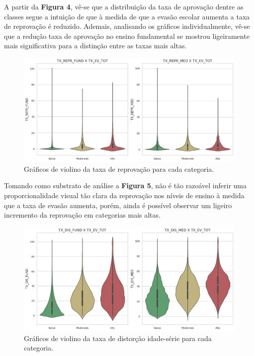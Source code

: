 \par A partir da \textbf{Figura 4}, vê-se que a distribuição da taxa de aprovação dentre as classes segue a intuição de que à medida de que a evasão escolar aumenta a taxa de reprovação é reduzido. Ademais, analisando os gráficos individualmente, vê-se que a redução taxa de aprovação no ensino fundamental se mostrou ligeiramente mais significativa para a distinção entre as taxas mais altas.

\begin{figure}[H]
    \centering
    \includegraphics[scale = 0.4]{Graphics/Vio-Repr.png}
    \caption{Gráficos de violino da taxa de reprovação para cada categoria.}
    \label{fig:enter-label}
\end{figure}

\par Tomando como substrato de análise a \textbf{Figura 5}, não é tão razoável inferir uma proporcionalidade visual tão clara da reprovação nos níveis de ensino à medida que a taxa de evasão aumenta, porém, ainda é possível observar um ligeiro incremento da reprovação em categorias mais altas.

\begin{figure}[H]
    \centering
    \includegraphics[scale = 0.4]{Graphics/Vio-DIS.png}
    \caption{Gráficos de violino da taxa de distorção idade-série para cada categoria.}
    \label{fig:enter-label}
\end{figure}

